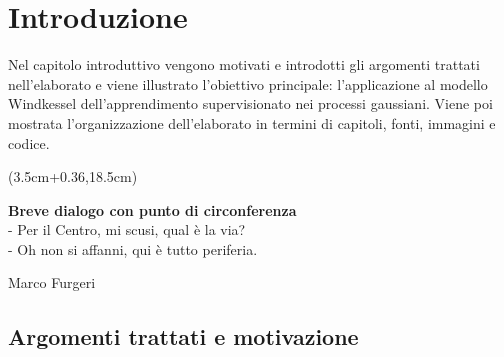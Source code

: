 \chapter{Introduzione}
Nel capitolo introduttivo vengono motivati e introdotti gli argomenti trattati nell'elaborato e viene illustrato l'obiettivo principale: l'applicazione al modello Windkessel dell'apprendimento supervisionato nei processi gaussiani. Viene poi mostrata l'organizzazione dell'elaborato in termini di capitoli, fonti, immagini e codice.


\begin{textblock*}{0.64\textwidth}(3.5cm+0.36\textwidth,18.5cm)
\epigraph{\textbf{Breve dialogo con punto di circonferenza}\\
- Per il Centro, mi scusi, qual è la via?\\
- Oh non si affanni, qui è tutto periferia.}{Marco Furgeri}
\end{textblock*}

\newpage




\section{Argomenti trattati e motivazione}
